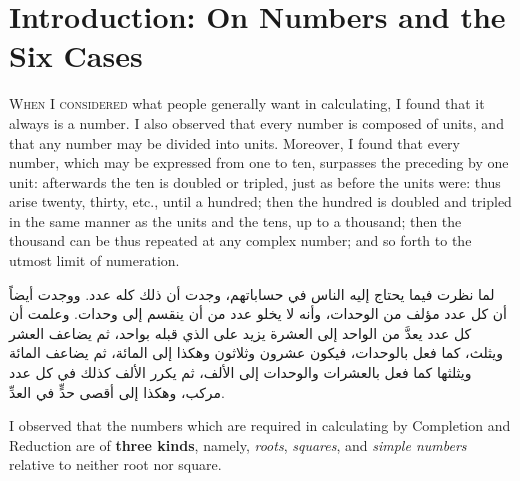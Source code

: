 \documentclass[11pt,a4paper]{book}
\newcommand{\editornote}[1]{\footnote{\textcolor{notecolor}{\textbf{[Ed.]} #1}}}
\newcommand{\ar}[1]{{\arabicfont\beginR #1\endR}}
\begin{document}
\chapter{Introduction: On Numbers and the Six Cases}
\label{ch:intro}

\lettrine[lines=3, lhang=0.33, nindent=0em, findent=3pt]{
\textcolor{dropgold}{W}}{hen I considered} what people generally want in calculating, I found
that it always is a number. I also observed that every number is composed of
units, and that any number may be divided into units. Moreover, I found that
every number, which may be expressed from one to ten, surpasses the preceding
by one unit: afterwards the ten is doubled or tripled, just as before the
units were: thus arise twenty, thirty, etc., until a hundred; then the hundred
is doubled and tripled in the same manner as the units and the tens, up to a
thousand; then the thousand can be thus repeated at any complex number; and so
forth to the utmost limit of numeration.

\begin{arabicbox}
\begin{Arabic}
لما نظرت فيما يحتاج إليه الناس في حساباتهم، وجدت أن ذلك كله
عدد. ووجدت أيضاً أن كل عدد مؤلف من الوحدات، وأنه لا يخلو
عدد من أن ينقسم إلى وحدات. وعلمت أن كل عدد يعدَّ من الواحد
إلى العشرة يزيد على الذي قبله بواحد، ثم يضاعف العشر ويثلث،
كما فعل بالوحدات، فيكون عشرون وثلاثون وهكذا إلى المائة،
ثم يضاعف المائة ويثلثها كما فعل بالعشرات والوحدات إلى
الألف، ثم يكرر الألف كذلك في كل عدد مركب، وهكذا إلى
أقصى حدٍّ في العدِّ.
\end{Arabic}
\end{arabicbox}

I observed that the numbers which are required in calculating by Completion
and Reduction are of \textbf{three kinds}, namely, \textit{roots}, \textit{squares},
and \textit{simple numbers} relative to neither root nor square.

\begin{mathbox}[title={\textbf{The Three Kinds of Numbers}}]
\end{mathbox}
\end{document}
